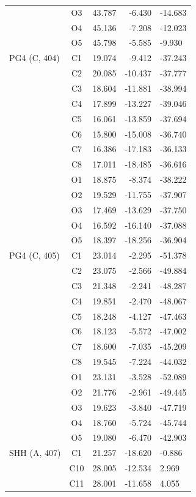 \begin{longtable}{@{}lcrr@{}}
   & O3 & 43.787 & -6.430 & -14.683 \\
   & O4 & 45.136 & -7.208 & -12.023 \\
   & O5 & 45.798 & -5.585 & -9.930 \\
  \cmidrule(r){1-5}
  PG4 (C, 404) & C1 & 19.074 & -9.412 & -37.243 \\
   & C2 & 20.085 & -10.437 & -37.777 \\
   & C3 & 18.604 & -11.881 & -38.994 \\
   & C4 & 17.899 & -13.227 & -39.046 \\
   & C5 & 16.061 & -13.859 & -37.694 \\
   & C6 & 15.800 & -15.008 & -36.740 \\
   & C7 & 16.386 & -17.183 & -36.133 \\
   & C8 & 17.011 & -18.485 & -36.616 \\
   & O1 & 18.875 & -8.374 & -38.222 \\
   & O2 & 19.529 & -11.755 & -37.907 \\
   & O3 & 17.469 & -13.629 & -37.750 \\
   & O4 & 16.592 & -16.140 & -37.088 \\
   & O5 & 18.397 & -18.256 & -36.904 \\
  \cmidrule(r){1-5}
  PG4 (C, 405) & C1 & 23.014 & -2.295 & -51.378 \\
   & C2 & 23.075 & -2.566 & -49.884 \\
   & C3 & 21.348 & -2.241 & -48.287 \\
   & C4 & 19.851 & -2.470 & -48.067 \\
   & C5 & 18.248 & -4.127 & -47.463 \\
   & C6 & 18.123 & -5.572 & -47.002 \\
   & C7 & 18.600 & -7.035 & -45.209 \\
   & C8 & 19.545 & -7.224 & -44.032 \\
   & O1 & 23.131 & -3.528 & -52.089 \\
   & O2 & 21.776 & -2.961 & -49.445 \\
   & O3 & 19.623 & -3.840 & -47.719 \\
   & O4 & 18.760 & -5.724 & -45.744 \\
   & O5 & 19.080 & -6.470 & -42.903 \\
  \cmidrule(r){1-5}
  SHH (A, 407) & C1 & 21.257 & -18.620 & -0.886 \\
   & C10 & 28.005 & -12.534 & 2.969 \\
   & C11 & 28.001 & -11.658 & 4.055 \\

\end{longtable}
